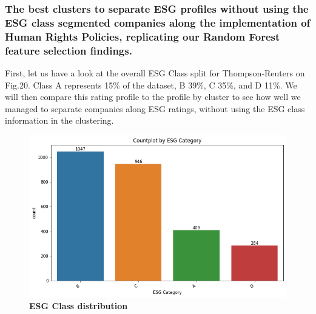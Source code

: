 \documentclass[12pt]{report}
\begin{document}
\subsubsection{The best clusters to separate ESG profiles without using the ESG class segmented companies along the implementation of Human Rights Policies, replicating our Random Forest feature selection findings.}

First, let us have a look at the overall ESG Class split for Thompson-Reuters on Fig.20. Class A represents 15\% of the dataset, B 39\%, C 35\%, and D 11\%. We will then compare this rating profile to the profile by cluster to see how well we managed to separate companies along ESG ratings, without using the ESG class information in the clustering.

\begin{figure}[h!]
\centering
\includegraphics[scale=0.5]{ESG_score_distribution.png}
\caption{\textbf{ESG Class distribution}}
\label{fig:esgclass}
\end{figure}
\end{document}
